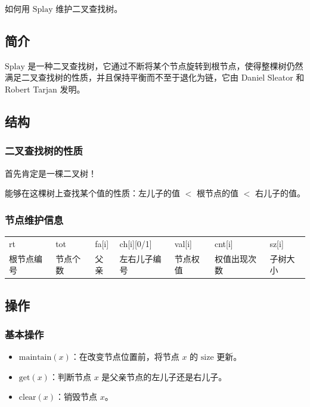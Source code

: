 
\begin{QUOTE}{}{}
如何用 $\text{Splay}$ 维护二叉查找树。
\end{QUOTE}

\hr

\subsection{简介}

$\text{Splay}$ 是一种二叉查找树，它通过不断将某个节点旋转到根节点，使得整棵树仍然满足二叉查找树的性质，并且保持平衡而不至于退化为链，它由 Daniel Sleator 和 Robert Tarjan 发明。

\hr

\subsection{结构}

\subsubsection{二叉查找树的性质}

首先肯定是一棵二叉树！

能够在这棵树上查找某个值的性质：左儿子的值 $<$ 根节点的值 $<$ 右儿子的值。

\subsubsection{节点维护信息}

\begin{tabular}{lllllll}
\hline
rt& tot& fa[i]& ch[i][0/1]& val[i]& cnt[i]& sz[i]\\根节点编号& 节点个数& 父亲& 左右儿子编号& 节点权值& 权值出现次数& 子树大小\\\hline
\end{tabular}

\hr

\subsection{操作}

\subsubsection{基本操作}

\begin{itemize}
\item $\text{maintain}(x)$：在改变节点位置前，将节点 $x$ 的 $\text{size}$ 更新。
\item $\text{get}(x)$：判断节点 $x$ 是父亲节点的左儿子还是右儿子。
\item $\text{clear}(x)$：销毁节点 $x$。
\end{itemize}

